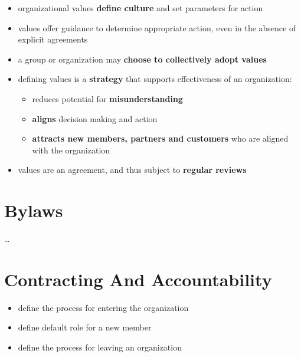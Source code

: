 \begin{itemize}
\item organizational values \textbf{define culture} and set parameters for action

\item values offer guidance to determine appropriate action, even in the absence of explicit agreements

\item a group or organization may \textbf{choose to collectively adopt values}

\item defining values is a \textbf{strategy} that supports effectiveness of an organization:

\begin{itemize}
\item reduces potential for \textbf{misunderstanding}

\item \textbf{aligns} decision making and action

\item \textbf{attracts new members, partners and customers} who are aligned with the organization

\end{itemize}

\item values are an agreement, and thus subject to \textbf{regular reviews}

\end{itemize}

\section{Bylaws}
\label{bylaws}

{\ldots}

\section{Contracting And Accountability}
\label{contractingandaccountability}

\begin{itemize}
\item define the process for entering the organization

\item define default role for a new member

\item define the process for leaving an organization

\end{itemize}

